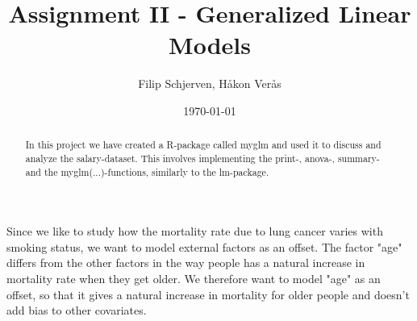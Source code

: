 \documentclass{article}
\title{Assignment II - Generalized Linear Models}
\author{Filip Schjerven, Håkon Verås}
\date{\today}
\begin{document}
\maketitle
\begin{abstract}
In this project we have created a R-package called myglm and used it to discuss and analyze the salary-dataset. This involves implementing the print-, anova-, summary- and the myglm(...)-functions, similarly to the lm-package.
\end{abstract}
\newpage

\section{}

\subsection{}
Since we like to study how the mortality rate due to lung cancer varies with smoking status, we want to model external factors as an offset. The factor "age" differs from the other factors in the way people has a natural increase in mortality rate when they get older. We therefore want to model "age" as an offset, so that it gives a natural increase in mortality for older people and doesn't add bias to other covariates.
\end{document}
